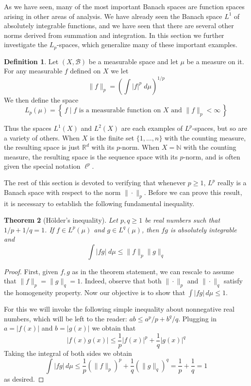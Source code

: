 \documentclass[11pt,oneside]{amsbook}
\newcommand{\set}[1]{\left\{\,#1\,\right\}}
\newcommand{\NN}{{\mathbb N}}
\newcommand{\RR}{{\mathbb R}}
\theoremstyle{definition}
\theoremstyle{plain}
\newtheorem{thm}{Theorem}[section]
\theoremstyle{definition}
\newtheorem{defn}[thm]{Definition}
\theoremstyle{remark}
\numberwithin{equation}{section}
\numberwithin{figure}{section}
\begin{document}
As we have seen, many of the most important Banach spaces are function spaces arising in other areas of analysis. We have already seen the Banach space $L^1$ of absolutely integrable functions, and we have seen that there are several other norms derived from summation and integration. In this section we further investigate the $L_p$-spaces, which generalize many of these important examples.

\begin{defn}
  Let $(X,\mathcal B)$ be a measurable space and let $\mu$ be a measure on it. For any measurable $f$ defined on $X$ we let
  \[\|f\|_p=\left(\int|f|^p\;d\mu\right)^{1/p}
  \]
  We then define the space
  \[L_p(\mu)=\set{f\mid\text{$f$ is a measurable function on $X$ and } \|f\|_p<\infty}
  \]
\end{defn}

Thus the spaces $L^1(X)$ and $L^2(X)$ are each examples of $L^p$-spaces, but so are a variety of others. When $X$ is the finite set $\{1,\ldots,n\}$ with the counting measure, the resulting space is just $\RR^d$ with its $p$-norm. When $X=\NN$ with the counting measure, the resulting space is the sequence space with its $p$-norm, and is often given the special notation $\ell^p$.

The rest of this section is devoted to verifying that whenever $p\geq1$, $L^p$ really is a Banach space with respect to the norm $\|\cdot\|_p$. Before we can prove this result, it is necessary to establish the following fundamental inequality.

\begin{thm}[H\"older's inequality]
  Let $p,q\geq1$ be real numbers such that $1/p+1/q=1$. If $f\in L^p(\mu)$ and $g\in L^q(\mu)$, then $fg$ is absolutely integrable and
  \[\int|fg|\;d\mu\leq\|f\|_p\|g\|_q
  \]
\end{thm}

\begin{proof}
  First, given $f,g$ as in the theorem statement, we can rescale to assume that $\|f\|_p=\|g\|_q=1$. Indeed, observe that both $\|\cdot\|_p$ and $\|\cdot\|_q$ satisfy the homogeneity property. Now our objective is to show that $\int|fg|\,d\mu\leq1$.

  For this we will invoke the following simple inequality about nonnegative real numbers, which will be left to the reader: $ab\leq a^p/p+b^q/q$. Plugging in $a=|f(x)|$ and $b=|g(x)|$ we obtain that
  \[|f(x)g(x)|\leq\frac1p|f(x)|^p+\frac1q|g(x)|^q
  \]
  Taking the integral of both sides we obtain
  \[\int|fg|\,d\mu\leq\frac1p(\|f\|_p)^p+\frac1q(\|g\|_q)^q
    =\frac1p+\frac1q=1
  \]
  as desired.
\end{proof}
\end{document}
